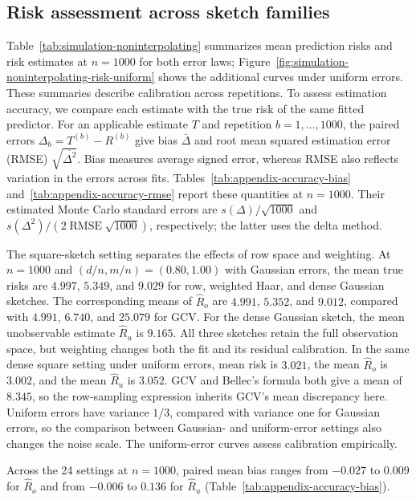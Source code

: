 \documentclass{article}
\theoremstyle{plain} %
\theoremstyle{definition} %
\theoremstyle{definition} %
\newcommand{\hR}{\hat{R}}
\begin{document}
\subsection{Risk assessment across sketch families}
\label{sec:simulation-noninterpolating}
\label{app:simulation-accuracy}
Table~\ref{tab:simulation-noninterpolating} summarizes mean prediction
risks and risk estimates at $n=1000$ for both error laws;
Figure~\ref{fig:simulation-noninterpolating-risk-uniform} shows the
additional curves under uniform errors. These summaries describe
calibration across repetitions. To assess estimation accuracy, we compare
each estimate with the true risk of the same fitted predictor. For an
applicable estimate $T$ and
repetition $b=1,\ldots,1000$, the paired errors $\Delta_b=T^{(b)}-R^{(b)}$ give bias $\bar\Delta$ and root mean
squared estimation error (RMSE) $\sqrt{\overline{\Delta^2}}$.
Bias measures average signed error, whereas RMSE also reflects variation
in the errors across fits. Tables~\ref{tab:appendix-accuracy-bias}
and~\ref{tab:appendix-accuracy-rmse} report these quantities at $n=1000$.
Their estimated Monte Carlo standard errors are $s(\Delta)/\sqrt{1000}$ and
$s(\Delta^2)/(2\operatorname{RMSE}\sqrt{1000})$, respectively;
the latter uses the delta method.

The square-sketch setting separates the effects of row space and weighting.
At $n=1000$ and $(d/n,m/n)=(0.80,1.00)$ with Gaussian errors,
the mean true risks are $4.997$, $5.349$, and $9.029$ for row,
weighted Haar, and dense Gaussian sketches. The corresponding means
of $\hR_o$ are $4.991$, $5.352$, and $9.012$, compared with
$4.991$, $6.740$, and $25.079$ for GCV. For the dense Gaussian
sketch, the mean unobservable estimate $\hR_u$ is $9.165$. All three
sketches retain the full observation space, but weighting changes
both the fit and its residual calibration. In the same dense square
setting under uniform errors, mean risk is
$3.021$, the mean $\hR_o$ is $3.002$, and the mean $\hR_u$ is
$3.052$. GCV and Bellec's formula both give a mean of $8.345$,
so the row-sampling expression inherits GCV's mean discrepancy here.
Uniform errors have variance $1/3$, compared with variance one for
Gaussian errors, so the comparison between Gaussian- and uniform-error settings
also changes the noise scale.
The uniform-error curves assess calibration empirically.

Across the 24 settings at $n=1000$, paired mean bias ranges from
$-0.027$ to $0.009$ for $\hR_o$ and from $-0.006$ to $0.136$
for $\hR_u$ (Table~\ref{tab:appendix-accuracy-bias}).
\end{document}
